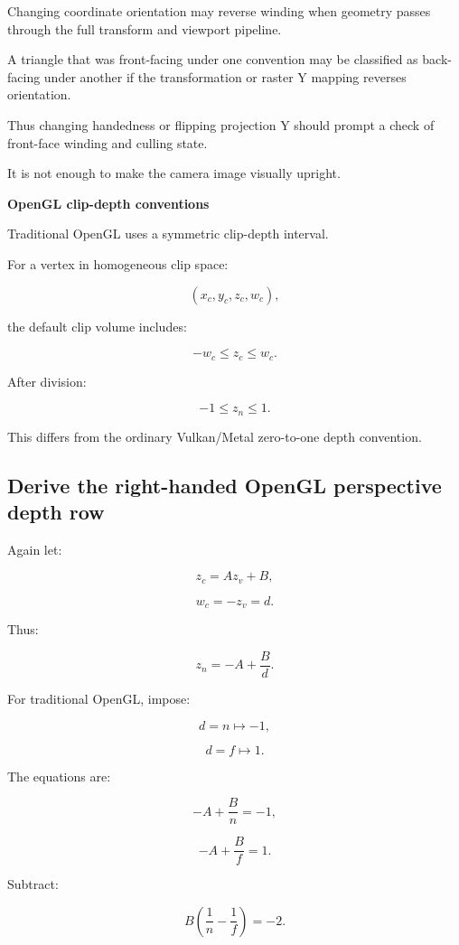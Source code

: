 Changing coordinate orientation may reverse winding when geometry passes through the full transform and viewport pipeline.

A triangle that was front-facing under one convention may be classified as back-facing under another if the transformation or raster Y mapping reverses orientation.

Thus changing handedness or flipping projection Y should prompt a check of front-face winding and culling state.

It is not enough to make the camera image visually upright.

\textbf{OpenGL clip-depth conventions}

Traditional OpenGL uses a symmetric clip-depth interval.

For a vertex in homogeneous clip space:

\[
 (x_c,y_c,z_c,w_c),
\]

the default clip volume includes:

\[
 \boxed{-w_c\le z_c\le w_c}.
\]

After division:

\[
 \boxed{-1\le z_n\le1}.
\]

This differs from the ordinary Vulkan/Metal zero-to-one depth convention.

\subsection{Derive the right-handed OpenGL perspective depth row}\label{02-foundations-ii-ch033-derive-the-right-handed-opengl-perspective-depth-row}

\hypertarget{02-foundations-ii-ch033-derive-the-right-handed-opengl-perspective-depth-row}{}

Again let:

\[
 z_c=Az_v+B,
\]

\[
 w_c=-z_v=d.
\]

Thus:

\[
 z_n=-A+\frac Bd.
\]

For traditional OpenGL, impose:

\[
 d=n\mapsto-1,
\]

\[
 d=f\mapsto1.
\]

The equations are:

\[
 -A+\frac Bn=-1,
\]

\[
 -A+\frac Bf=1.
\]

Subtract:

\[
 B\left(\frac1n-\frac1f\right)=-2.
\]


